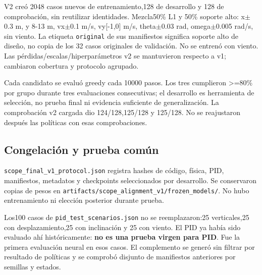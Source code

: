 \documentclass[12pt,a4paper]{article}
\begin{document}
V2 creó 2048 casos nuevos de entrenamiento,\allowbreak{}128 de desarrollo y 128 de comprobación,\allowbreak{} sin reutilizar identidades. Mezcla50\% L1 y 50\% soporte alto: x\ensuremath{\pm}0.3 m,\allowbreak{} y 8-13 m,\allowbreak{} vx\ensuremath{\pm}0.1 m/\allowbreak{}s,\allowbreak{} vy[-1,\allowbreak{}0] m/\allowbreak{}s,\allowbreak{} theta\ensuremath{\pm}0.03 rad,\allowbreak{} omega\ensuremath{\pm}0.005 rad/\allowbreak{}s,\allowbreak{} sin viento. La etiqueta \nolinkurl{original} de sus manifiestos significa soporte alto de diseño,\allowbreak{} no copia de los 32 casos originales de validación. No se entrenó con viento. Las pérdidas/\allowbreak{}escalas/\allowbreak{}hiperparámetros v2 se mantuvieron respecto a v1; cambiaron cobertura y protocolo agrupado.


Cada candidato se evaluó greedy cada 10000 pasos. Los tres cumplieron >=80\% por grupo durante tres evaluaciones consecutivas; el desarrollo es herramienta de selección,\allowbreak{} no prueba final ni evidencia suficiente de generalización. La comprobación v2 cargada dio 124/\allowbreak{}128,\allowbreak{}125/\allowbreak{}128 y 125/\allowbreak{}128. No se reajustaron después las políticas con esas comprobaciones.



\subsection{Congelación y prueba común}
\textcolor{Accent}{\nolinkurl{scope_final_v1_protocol.json}} registra hashes de código,\allowbreak{} física,\allowbreak{} PID,\allowbreak{} manifiestos,\allowbreak{} metadatos y checkpoints seleccionados por desarrollo. Se conservaron copias de pesos en \nolinkurl{artifacts/scope_alignment_v1/frozen_models/}. No hubo entrenamiento ni elección posterior durante prueba.


Los100 casos de \textcolor{Accent}{\nolinkurl{pid_test_scenarios.json}} no se reemplazaron:25 verticales,\allowbreak{}25 con desplazamiento,\allowbreak{}25 con inclinación y 25 con viento. El PID ya había sido evaluado ahí históricamente: \textbf{no es una prueba virgen para PID}. Fue la primera evaluación neural en esos casos. El complemento se generó sin filtrar por resultado de políticas y se comprobó disjunto de manifiestos anteriores por semillas y estados.
\end{document}
